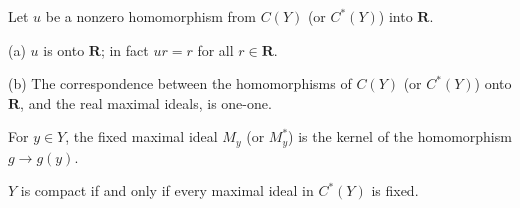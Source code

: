 Let $u$ be a nonzero homomorphism from $C(Y)$ (or $C^*(Y)$) into $\mathbf{R}$.

(a) $u$ is onto $\mathbf{R}$; in fact $u r = r$ for all $r \in \mathbf{R}$.

(b) The correspondence between the homomorphisms of $C(Y)$ (or $C^*(Y)$)
onto $\mathbf{R}$, and the real maximal ideals, is one-one.

For $y \in Y$, the fixed maximal ideal $M_y$ (or $M^*_y$) is the kernel
of the homomorphism $g \rightarrow g(y)$.

$Y$ is compact if and only if every maximal ideal in $C^*(Y)$ is fixed.
